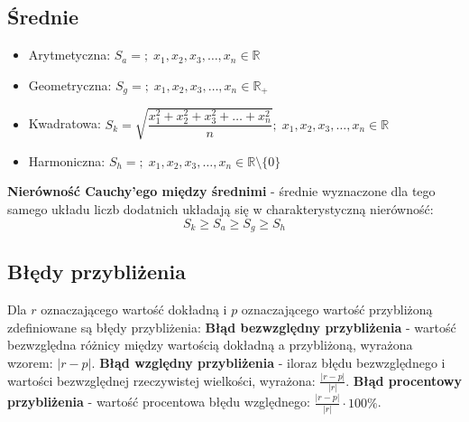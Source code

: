 \documentclass[14pt,a4paper]{extarticle}
\begin{document}
\noindent\subsection{Średnie}

\begin{itemize}
   \item Arytmetyczna: $S_{a} = $$;\; x_{1}, x_{2}, x_{3}, \ldots, x_{n} \in \mathbb{R}$
   \item Geometryczna: $S_{g} = $$;\; x_{1}, x_{2}, x_{3}, \ldots, x_{n} \in \mathbb{R}_{+}$
   \item Kwadratowa: $S_{k} = \sqrt{\dfrac{\displaystyle x_{1}^{2} + x_{2}^{2} + x_{3}^{2} + \ldots + x_{n}^{2}}{\displaystyle n}};\; x_{1}, x_{2}, x_{3}, \ldots, x_{n} \in \mathbb{R}$
   \item Harmoniczna: $S_{h} = $$;\; x_{1}, x_{2}, x_{3}, \ldots, x_{n} \in \mathbb{R} \!\setminus\!\{0\} $
\end{itemize}
\vspace{0.8cm}
\textbf{Nierówność Cauchy'ego między średnimi} - średnie wyznaczone dla tego samego układu liczb dodatnich układają się w charakterystyczną nierówność:
$$S_{k} \geq S_{a} \geq S_{g} \geq S_{h}$$

\newpage
\noindent\subsection{Błędy przybliżenia}
Dla $r$ oznaczającego wartość dokładną i $p$ oznaczającego wartość przybliżoną zdefiniowane są błędy przybliżenia:\hfill\break
\noindent\textbf{Błąd bezwzględny przybliżenia} - wartość bezwzględna różnicy między wartością dokładną a przybliżoną, wyrażona wzorem: $\vert r - p\vert$.\hfill\break
\textbf{Błąd względny przybliżenia} - iloraz błędu bezwzględnego i wartości bezwzględnej rzeczywistej wielkości, wyrażona: $\frac{\displaystyle\vert r - p\vert}{\displaystyle\vert r\vert}$.\hfill\break
\textbf{Błąd procentowy przybliżenia} - wartość procentowa błędu względnego: \hfill\break$\frac{\displaystyle\vert r - p\vert}{\displaystyle\vert r\vert} \cdot 100\%$.\\
\end{document}

